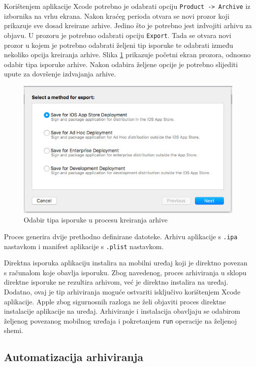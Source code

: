 \documentclass[times, utf8, diplomski, numeric]{fer}
\begin{document}
Korištenjem aplikacije Xcode potrebno je odabrati opciju \verb|Product -> Archive| iz izbornika na vrhu ekrana. Nakon kraćeg perioda otvara se novi prozor koji prikazuje sve dosad kreirane arhive. Jedino što je potrebno jest izdvojiti arhivu za objavu. U prozoru je potrebno odabrati opciju \verb|Export|. Tada se otvara novi prozor u kojem je potrebno odabrati željeni tip isporuke te odabrati između nekoliko opcija kreiranja arhive. Slika \ref{fig:XcodeArchiveOptions} prikazuje početni ekran prozora, odnosno odabir tipa isporuke arhive. Nakon odabira željene opcije je potrebno slijediti upute za dovršenje izdvajanja arhive.

\begin{figure}
\centering
\includegraphics[scale=0.6]{XcodeArchiveOptions}
\caption{Odabir tipa isporuke u procesu kreiranja arhive}
\label{fig:XcodeArchiveOptions}
\end{figure}

Proces generira dvije prethodno definirane datoteke. Arhivu aplikacije s \verb|.ipa| nastavkom i manifest aplikacije s \verb|.plist| nastavkom.

Direktna isporuka aplikaciju instalira na mobilni uređaj koji je direktno povezan s računalom koje obavlja isporuku. Zbog navedenog, proces arhiviranja u sklopu direktne isporuke ne rezultira arhivom, već je direktno instalira na uređaj. Dodatno, ovaj je tip arhiviranja moguće ostvariti isključivo korištenjem Xcode aplikacije. Apple zbog sigurnosnih razloga ne želi objaviti proces direktne instalacije aplikacije na uređaj. Arhiviranje i instalacija obavljaju se odabirom željenog povezanog mobilnog uređaja i pokretanjem \verb|run| operacije na željenoj shemi.

\subsection{Automatizacija arhiviranja}
\end{document}
